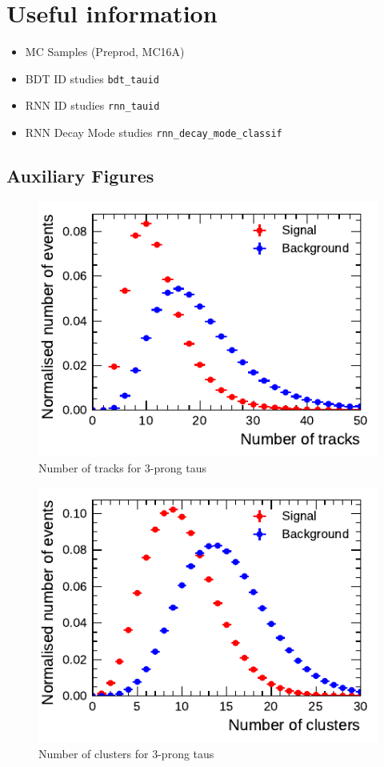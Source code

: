 \chapter{Useful information}
\label{sec:app}

\begin{itemize}
\item MC Samples (Preprod, MC16A)
\item BDT ID studies \texttt{bdt\_tauid}
\item RNN ID studies \texttt{rnn\_tauid}
\item RNN Decay Mode studies \texttt{rnn\_decay\_mode\_classif}
\end{itemize}

\section{Auxiliary Figures}

\begin{figure}[htpb]
  \centering
  \includegraphics{./figures/rnn/ntrk_3p.pdf}
  \caption{Number of tracks for 3-prong taus}
  \label{fig:total_tracks_3p}
\end{figure}

\begin{figure}[htpb]
  \centering
  \includegraphics{./figures/rnn/ncls_3p.pdf}
  \caption{Number of clusters for 3-prong taus}
  \label{fig:total_clusters_3p}
\end{figure}

